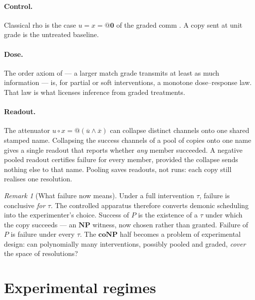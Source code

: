 \documentclass[11pt]{article}
\makeatletter
\theoremstyle{definition}
\theoremstyle{plain}
\theoremstyle{remark}
\newtheorem{remark}[definition]{Remark}
\newcommand{\quo}[1]{@#1}
\newcommand{\dr}[1]{\overline{#1}}
\newcommand{\nil}{\mathbf{0}}
\newcommand{\cmp}{\mathbin{\circ}}
\newcommand{\NPclass}{\mathbf{NP}}
\newcommand{\coNP}{\mathbf{coNP}}
\makeatother
\begin{document}
\paragraph{Control.} Classical rho is the case $u = x = \quo{\nil}$ of the
graded comm \cite{FuzzyRho}. A copy sent at unit grade is the untreated
baseline.

\paragraph{Dose.} The order axiom of \cite{FuzzyRho} --- a larger match
grade transmits at least as much information --- is, for partial or soft
interventions, a monotone dose--response law. That law is what licenses
inference from graded treatments.

\paragraph{Readout.} The attenuator $u \cmp x = \quo{(\dr{u} \wedge
\dr{x})}$ can collapse distinct channels onto one shared stamped name.
Collapsing the success channels of a pool of copies onto one name gives a
single readout that reports whether \emph{any} member succeeded. A
negative pooled readout certifies failure for every member, provided the
collapse sends nothing else to that name. Pooling saves readouts, not
runs: each copy still realises one resolution.

\begin{remark}[What failure now means]
Under a full intervention $\tau$, failure is conclusive \emph{for $\tau$}.
The controlled apparatus therefore converts demonic scheduling into the
experimenter's choice. Success of $P$ is the existence of a $\tau$ under
which the copy succeeds --- an $\NPclass$ witness, now chosen rather than
granted. Failure of $P$ is failure under every $\tau$. The $\coNP$ half
becomes a problem of experimental design: can polynomially many
interventions, possibly pooled and graded, \emph{cover} the space of
resolutions?
\end{remark}

\section{Experimental regimes}\label{sec:regimes}
\end{document}
